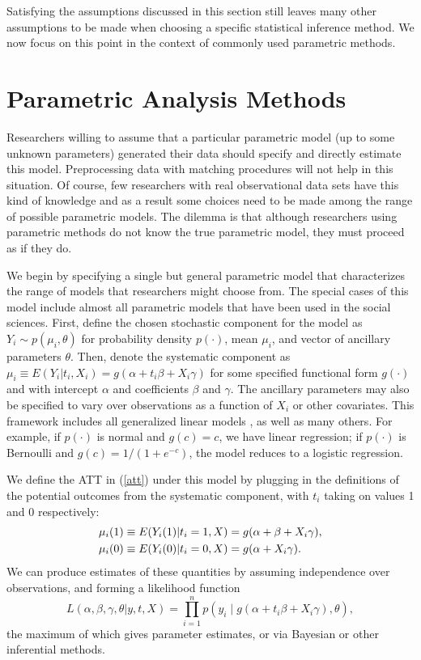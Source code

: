 \documentclass[11pt,titlepage]{article}
\begin{document}
Satisfying the assumptions discussed in this section still leaves many
other assumptions to be made when choosing a specific statistical
inference method.  We now focus on this point in the context of
commonly used parametric methods.

\section{Parametric Analysis Methods}

Researchers willing to assume that a particular parametric model (up
to some unknown parameters) generated their data should specify and
directly estimate this model.  Preprocessing data with matching
procedures will not help in this situation.  Of course, few
researchers with real observational data sets have this kind of
knowledge and as a result some choices need to be made among the range
of possible parametric models.  The dilemma is that although
researchers using parametric methods do not know the true parametric
model, they must proceed as if they do.

We begin by specifying a single but general parametric model that
characterizes the range of models that researchers might choose from.
The special cases of this model include almost all parametric models
that have been used in the social sciences.  First, define the chosen
stochastic component for the model as $Y_i \sim p(\mu_i,\theta)$ for
probability density $p(\cdot)$, mean $\mu_i$, and vector of ancillary
parameters $\theta$.  Then, denote the systematic component as
$\mu_i\equiv E(Y_i|t_i,X_i)=g(\alpha + t_i\beta + X_i\gamma)$ for some
specified functional form $g(\cdot)$ and with intercept $\alpha$ and
coefficients $\beta$ and $\gamma$.  The ancillary parameters may also
be specified to vary over observations as a function of $X_i$ or other
covariates.  This framework includes all generalized linear models
\citep{McCNel89}, as well as many others.  For example, if $p(\cdot)$
is normal and $g(c)=c$, we have linear regression; if $p(\cdot)$ is
Bernoulli and $g(c)=1/(1+e^{-c})$, the model reduces to a logistic
regression.

We define the ATT in (\ref{att}) under this model by plugging in the
definitions of the potential outcomes from the systematic component,
with $t_i$ taking on values 1 and 0 respectively:
\begin{align}
  \label{matt}
\mu_i(1)&\equiv E(Y_i(1)|t_i=1,X)= g(\alpha + \beta + X_i\gamma),\notag \\
\mu_i(0)&\equiv E(Y_i(0)|t_i=0,X) = g(\alpha + X_i\gamma).
\end{align}
We can produce estimates of these quantities by assuming independence
over observations, and forming a likelihood function
\begin{equation}
  \label{lik}
  L(\alpha,\beta,\gamma,\theta|y, t, X) = \prod_{i=1}^n 
  p\left(y_i \mid g(\alpha + t_i\beta + X_i\gamma), \theta\right),
\end{equation}
the maximum of which gives parameter estimates, or via Bayesian or
other inferential methods.
\end{document}

